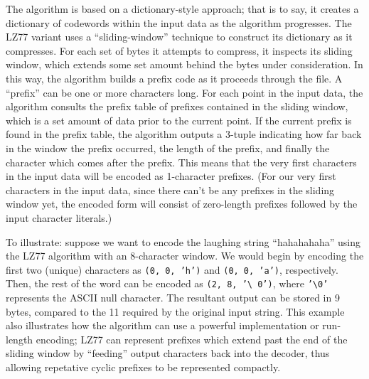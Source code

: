 \documentclass[12pt]{article}
\begin{document}
The algorithm is based on a dictionary-style approach; that is to say,
it creates a dictionary of codewords within the input data as the
algorithm progresses. The LZ77 variant uses a ``sliding-window''
technique to construct its dictionary as it compresses. \cite{lz77}
For each set of bytes it attempts to compress, it inspects its sliding
window, which extends some set amount behind the bytes under
consideration. In this way, the algorithm builds a prefix code as it
proceeds through the file. A ``prefix'' can be one or more characters
long. For each point in the input data, the algorithm consults the
prefix table of prefixes contained in the sliding window, which is a
set amount of data prior to the current point. If the current prefix
is found in the prefix table, the algorithm outputs a 3-tuple
indicating how far back in the window the prefix occurred, the length
of the prefix, and finally the character which comes after the
prefix. This means that the very first characters in the input data
will be encoded as 1-character prefixes. (For our very first
characters in the input data, since there can't be any prefixes in the
sliding window yet, the encoded form will consist of zero-length
prefixes followed by the input character literals.)

To illustrate: suppose we want to encode the laughing string
``hahahahaha'' using the LZ77 algorithm with an 8-character window. We
would begin by encoding the first two (unique) characters as
\texttt{(0, 0, 'h')} and \texttt{(0, 0, 'a')}, respectively. Then, the
rest of the word can be encoded as \texttt{(2, 8, '\textbackslash
  0')}, where \texttt{'\textbackslash 0'} represents the ASCII null
character. The resultant output can be stored in 9 bytes, compared to
the 11 required by the original input string. This example also
illustrates how the algorithm can use a powerful implementation or
run-length encoding; LZ77 can represent prefixes which extend past the
end of the sliding window by ``feeding'' output characters back into
the decoder, thus allowing repetative cyclic prefixes to be
represented compactly.
\end{document}
